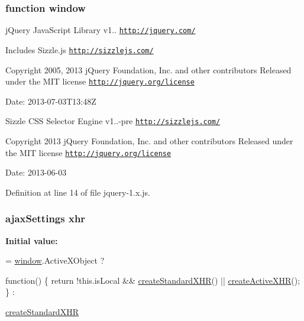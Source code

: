 \subsubsection[{\texorpdfstring{window}{window}}]{\setlength{\rightskip}{0pt plus 5cm}function window}\hypertarget{jquery-1_8x_8js_ad55530ae1e5978df8e721017c1fc8466}{}\label{jquery-1_8x_8js_ad55530ae1e5978df8e721017c1fc8466}
j\+Query Java\+Script Library v1.. \href{http://jquery.com/}{\tt http\+://jquery.\+com/}

Includes Sizzle.\+js \href{http://sizzlejs.com/}{\tt http\+://sizzlejs.\+com/}

Copyright 2005, 2013 j\+Query Foundation, Inc. and other contributors Released under the M\+IT license \href{http://jquery.org/license}{\tt http\+://jquery.\+org/license}

Date\+: 2013-\/07-\/03\+T13\+:48Z

Sizzle C\+SS Selector Engine v1..-\/pre \href{http://sizzlejs.com/}{\tt http\+://sizzlejs.\+com/}

Copyright 2013 j\+Query Foundation, Inc. and other contributors Released under the M\+IT license \href{http://jquery.org/license}{\tt http\+://jquery.\+org/license}

Date\+: 2013-\/06-\/03 

Definition at line 14 of file jquery-\/1.\+x.\+js.

\subsubsection[{\texorpdfstring{xhr}{xhr}}]{ ajax\+Settings xhr}\hypertarget{jquery-1_8x_8js_a0b7a5cb538ca9913b1b3b1c807ad06f0}{}\label{jquery-1_8x_8js_a0b7a5cb538ca9913b1b3b1c807ad06f0}
{\bfseries Initial value\+:}
\begin{DoxyCode}
= \hyperlink{jquery-1_8x_8js_ad55530ae1e5978df8e721017c1fc8466}{window}.ActiveXObject ?
    
    \textcolor{keyword}{function}() \{
        \textcolor{keywordflow}{return} !this.isLocal && \hyperlink{jquery-1_8x_8js_acea019a8b67e4d114deb75d1e0b3474a}{createStandardXHR}() || 
      \hyperlink{jquery-1_8x_8js_a54bf63f1b5f905292db45a1d6a9dc300}{createActiveXHR}();
    \} :
    
    \hyperlink{jquery-1_8x_8js_acea019a8b67e4d114deb75d1e0b3474a}{createStandardXHR}
\end{DoxyCode}


